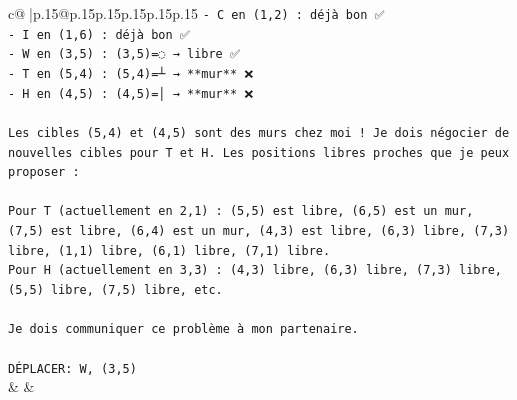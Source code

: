 \documentclass{article}
\begin{document}
{\begin{supertabular}{c@{$\;$}|p{.15\linewidth}@{}p{.15\linewidth}p{.15\linewidth}p{.15\linewidth}p{.15\linewidth}p{.15\linewidth}}
{{{\texttt{{-} C en (1,2) : déjà bon ✅} \\
\texttt{{-} I en (1,6) : déjà bon ✅} \\
\texttt{{-} W en (3,5) : (3,5)=◌ → libre ✅} \\
\texttt{{-} T en (5,4) : (5,4)=┴ → **mur** ❌} \\
\texttt{{-} H en (4,5) : (4,5)=│ → **mur** ❌} \\
\\ 
\texttt{Les cibles (5,4) et (4,5) sont des murs chez moi ! Je dois négocier de nouvelles cibles pour T et H. Les positions libres proches que je peux proposer :} \\
\\ 
\texttt{Pour T (actuellement en 2,1) : (5,5) est libre, (6,5) est un mur, (7,5) est libre, (6,4) est un mur, (4,3) est libre, (6,3) libre, (7,3) libre, (1,1) libre, (6,1) libre, (7,1) libre.} \\
\texttt{Pour H (actuellement en 3,3) : (4,3) libre, (6,3) libre, (7,3) libre, (5,5) libre, (7,5) libre, etc.} \\
\\ 
\texttt{Je dois communiquer ce problème à mon partenaire.} \\
\\ 
\texttt{DÉPLACER: W, (3,5)} \\
            }
        }
    }
    & & \\ \\


\end{supertabular}}
\end{document}
